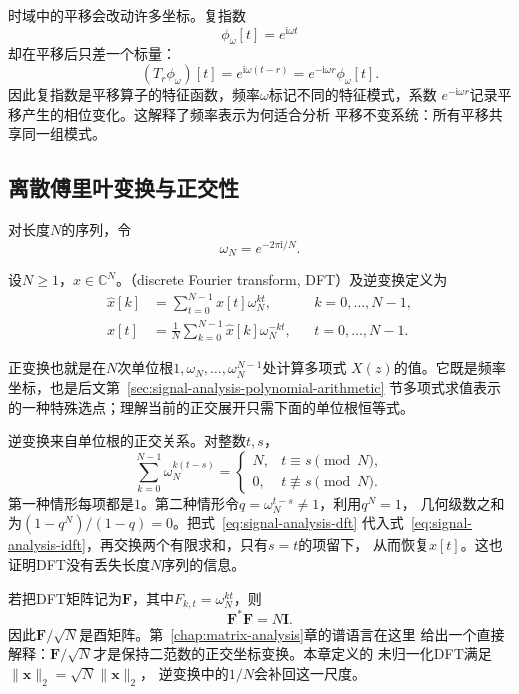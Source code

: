 时域中的平移会改动许多坐标。复指数
\[
  \phi_{\omega}[t]=e^{\mathrm{i}\omega t}
\]
却在平移后只差一个标量：
\[
  (T_r\phi_{\omega})[t]
  =
  e^{\mathrm{i}\omega(t-r)}
  =
  e^{-\mathrm{i}\omega r}\phi_{\omega}[t].
\]
因此复指数是平移算子的特征函数，频率$\omega$标记不同的特征模式，系数
$e^{-\mathrm{i}\omega r}$记录平移产生的相位变化。这解释了频率表示为何适合分析
平移不变系统：所有平移共享同一组模式。

\subsection{离散傅里叶变换与正交性}

对长度$N$的序列，令
\[
  \omega_N=e^{-2\pi\mathrm{i}/N}.
\]
\begin{definition}[离散傅里叶变换]
\label{def:signal-analysis-dft}
设$N\geq1$，$x\in\mathbb C^N$。（discrete Fourier transform, DFT）及逆变换定义为
\begin{align}
  \widehat{x}[k]
  &=
  \sum_{t=0}^{N-1}x[t]\omega_N^{kt},
  &&k=0,\ldots,N-1,
  \label{eq:signal-analysis-dft}\\
  x[t]
  &=
  \frac{1}{N}\sum_{k=0}^{N-1}
  \widehat{x}[k]\omega_N^{-kt},
  &&t=0,\ldots,N-1.
  \label{eq:signal-analysis-idft}
\end{align}
\end{definition}
正变换也就是在$N$次单位根$1,\omega_N,\ldots,\omega_N^{N-1}$处计算多项式
$X(z)$的值。它既是频率坐标，也是后文第~\ref{sec:signal-analysis-polynomial-arithmetic}
节多项式求值表示的一种特殊选点；理解当前的正交展开只需下面的单位根恒等式。

逆变换来自单位根的正交关系。对整数$t,s$，
\begin{equation}
  \sum_{k=0}^{N-1}\omega_N^{k(t-s)}
  =
  \begin{cases}
    N,&t\equiv s\pmod N,\\
    0,&t\not\equiv s\pmod N.
  \end{cases}
  \label{eq:signal-analysis-root-orthogonality}
\end{equation}
第一种情形每项都是$1$。第二种情形令$q=\omega_N^{t-s}\neq1$，利用$q^N=1$，
几何级数之和为$(1-q^N)/(1-q)=0$。把式~\eqref{eq:signal-analysis-dft}
代入式~\eqref{eq:signal-analysis-idft}，再交换两个有限求和，只有$s=t$的项留下，
从而恢复$x[t]$。这也证明DFT没有丢失长度$N$序列的信息。

若把DFT矩阵记为$\bm{F}$，其中$F_{k,t}=\omega_N^{kt}$，则
\[
  \bm{F}^{*}\bm{F}=N\bm{I}.
\]
因此$\bm{F}/\sqrt{N}$是酉矩阵。第~\ref{chap:matrix-analysis}章的谱语言在这里
给出一个直接解释：$\bm{F}/\sqrt{N}$才是保持二范数的正交坐标变换。本章定义的
未归一化DFT满足
$\lVert\widehat{\bm{x}}\rVert_2=\sqrt{N}\lVert\bm{x}\rVert_2$，
逆变换中的$1/N$会补回这一尺度。

